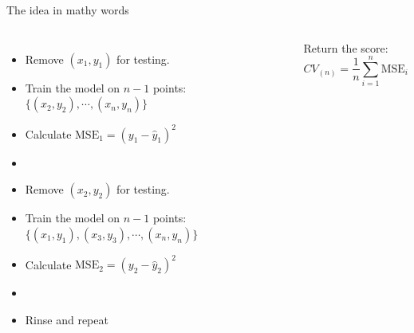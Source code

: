 \documentclass[aspectratio=169,usenames,dvipsnames]{beamer}
\begin{document}
\begin{frame}[c]{The idea in mathy words}

\begin{columns}
\centering
\begin{itemize}
	\item Remove $(x_1,y_1)$ for testing.
	\item Train the model on $n-1$ points: $\{(x_2,y_2), \cdots, (x_n,y_n)\}$
	\item Calculate $\mathrm{MSE}_1 = (y_1-\hat y_1)^2$
	\item[]
	\item Remove $(x_2,y_2)$ for testing.
	\item Train the model on $n-1$ points: $\{(x_1,y_1),(x_3,y_3), \cdots, (x_n,y_n)\}$
	\item Calculate $\mathrm{MSE}_2 = (y_2-\hat y_2)^2$
	\item []
	\item Rinse and repeat
\end{itemize}
\centering

Return the score:
\begin{equation*}
	CV_{(n)} = \frac{1}{n}\sum_{i=1}^n \mathrm{MSE}_i
\end{equation*}
\end{columns}

\end{frame}
\end{document}
